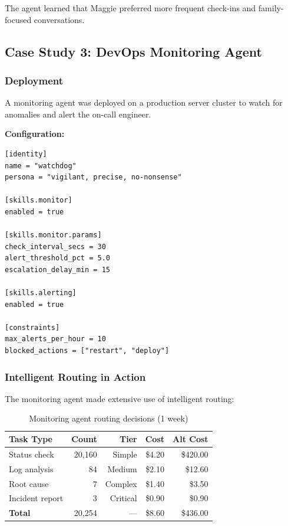 \documentclass[conference]{IEEEtran}
\begin{document}
The agent learned that Maggie preferred more frequent check-ins and family-focused conversations.

\subsection{Case Study 3: DevOps Monitoring Agent}

\subsubsection{Deployment}

A monitoring agent was deployed on a production server cluster to watch for anomalies and alert the on-call engineer.

\textbf{Configuration:}
\begin{lstlisting}[style=tomlcode]
[identity]
name = "watchdog"
persona = "vigilant, precise, no-nonsense"

[skills.monitor]
enabled = true

[skills.monitor.params]
check_interval_secs = 30
alert_threshold_pct = 5.0
escalation_delay_min = 15

[skills.alerting]
enabled = true

[constraints]
max_alerts_per_hour = 10
blocked_actions = ["restart", "deploy"]
\end{lstlisting}

\subsubsection{Intelligent Routing in Action}

The monitoring agent made extensive use of intelligent routing:

\begin{table}[h]
\centering
\caption{Monitoring agent routing decisions (1 week)}
\label{tab:monitor_routing}
\begin{tabular}{lrrrr}
\toprule
\textbf{Task Type} & \textbf{Count} & \textbf{Tier} & \textbf{Cost} & \textbf{Alt Cost} \\
\midrule
Status check & 20,160 & Simple & \$4.20 & \$420.00 \\
Log analysis & 84 & Medium & \$2.10 & \$12.60 \\
Root cause & 7 & Complex & \$1.40 & \$3.50 \\
Incident report & 3 & Critical & \$0.90 & \$0.90 \\
\midrule
\textbf{Total} & 20,254 & --- & \$8.60 & \$436.00 \\
\bottomrule
\end{tabular}
\end{table}
\end{document}
